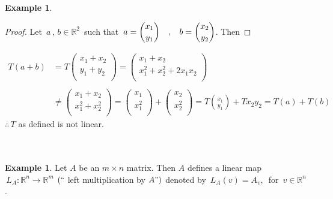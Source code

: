 \documentclass[11pt,a4paper]{article}
\theoremstyle{definition}
\newtheorem{exa}[thm]{Example}
\begin{document}
\begin{exa}
\begin{enumerate}
\begin{proof}
Let $\, a\, ,\, b\in \mathbb{R}^2\,$ such that  $\, \displaystyle{a = \binom{x_1}{y_1}\, \hspace{0.3cm},\hspace{0.3cm} b = \binom{x_2}{y_2}}$. Then
\end{proof}
\begin{align*}
T(a + b) & = T\begin{pmatrix}
x_1 + x_2\\
y_1 + y_2\\
\end{pmatrix} = \begin{pmatrix}
x_1 + x_2\\
x_1^2 + x_2^2 + 2x_1x_2\\
\end{pmatrix}\\\\
& \neq \begin{pmatrix}
x_1 + x_2\\
x_1^2 + x_2^2\\
\end{pmatrix} = \begin{pmatrix}
x_1\\
x_1^2\\
\end{pmatrix} + \begin{pmatrix}
x_2\\
x_2^2\\
\end{pmatrix} = T\binom{x_1}{y_1} + T{x_2}{y_2} = T(a) + T(b)
\end{align*} 
$\therefore\, T$ as defined is not linear.\\\\\\
\end{enumerate}
\end{exa}







\begin{exa}
Let $A$ be an $m\times n$ matrix. Then $A$ defines a linear map $\, L_A : \mathbb{R}^n \longrightarrow \mathbb{R}^m$ $(``$ left multiplication by $A")$ denoted by $\, L_A(v) = A_v,\, $ for $\, v\in \mathbb{R}^n$.\\\\
\end{exa}
\end{document}
